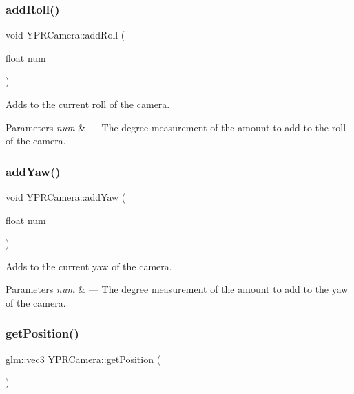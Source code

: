\subsubsection{\texorpdfstring{add\+Roll()}{addRoll()}}
{\footnotesize\ttfamily void Y\+P\+R\+Camera\+::add\+Roll (\begin{DoxyParamCaption}\item[{float}]{num }\end{DoxyParamCaption})}



Adds to the current roll of the camera. 


\begin{DoxyParams}{Parameters}
{\em num} & --- The degree measurement of the amount to add to the roll of the camera. \\
\hline
\end{DoxyParams}
\mbox{\label{class_y_p_r_camera_abca416bb77e38db7526e54e139153554}} 
\subsubsection{\texorpdfstring{add\+Yaw()}{addYaw()}}
{\footnotesize\ttfamily void Y\+P\+R\+Camera\+::add\+Yaw (\begin{DoxyParamCaption}\item[{float}]{num }\end{DoxyParamCaption})}



Adds to the current yaw of the camera. 


\begin{DoxyParams}{Parameters}
{\em num} & --- The degree measurement of the amount to add to the yaw of the camera. \\
\hline
\end{DoxyParams}
\mbox{\label{class_y_p_r_camera_a7a8964c4ec47fea7ffd7942449237788}} 
\subsubsection{\texorpdfstring{get\+Position()}{getPosition()}}
{\footnotesize\ttfamily glm\+::vec3 Y\+P\+R\+Camera\+::get\+Position (\begin{DoxyParamCaption}{ }\end{DoxyParamCaption})}



